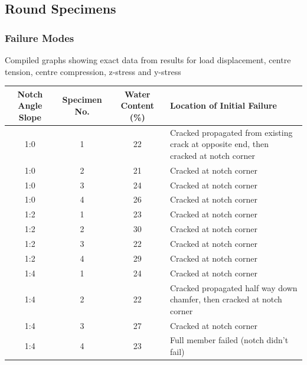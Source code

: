 \documentclass[11pt,a4paper]{article}
\numberwithin{equation}{subsection}
\begin{document}
\subsection{Round Specimens}
\subsubsection{Failure Modes}
\vspace*{\baselineskip}
\noindent Compiled graphs showing exact data from results for load displacement, centre tension, centre compression, z-stress and y-stress \par

\vspace*{\baselineskip}

\pagebreak
{}
\begin{center}
	\begin{tabular}{|c|c|c|p{4.5cm}|} 
		\hline
		
		\textbf{Notch Angle Slope} & \textbf{Specimen No.} & \textbf{Water Content (\%)} & \textbf{Location of Initial Failure}\\ [0.5ex]
		\hline
		
		1:0 & 1 & 22 & Cracked propagated from existing crack at opposite end, then cracked at notch corner  \\ [0.5ex]
		\hline
		1:0 & 2 & 21 & Cracked at notch corner  \\ [0.5ex]
		\hline
		1:0 & 3 & 24 & Cracked at notch corner  \\ [0.5ex]
		\hline
		1:0 & 4 & 26 & Cracked at notch corner \\ [0.5ex]
		\hline
		
		1:2 & 1 & 23 & Cracked at notch corner \\ [0.5ex]
		\hline
		1:2 & 2 & 30 & Cracked at notch corner \\ [0.5ex]
		\hline
		1:2 & 3 & 22 & Cracked at notch corner \\ [0.5ex]
		\hline
		1:2 & 4 & 29 & Cracked at notch corner \\ [0.5ex]
		\hline
		
		1:4 & 1 & 24 & Cracked at notch corner \\ [0.5ex]
		\hline
		1:4 & 2 & 22 & Cracked propagated half way down chamfer, then cracked at notch corner \\ [0.5ex]
		\hline
		1:4 & 3 & 27 & Cracked at notch corner \\ [0.5ex]
		\hline
		1:4 & 4 & 23 & Full member failed (notch didn't fail) \\ [0.5ex]
		\hline
		
	\end{tabular}
\end{center}
\end{document}
